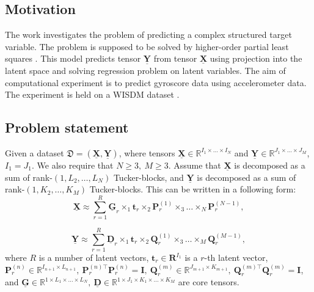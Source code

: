 \documentclass[../../main.tex]{subfiles}
\begin{document}
\subsection{Motivation}

%
%


The work investigates the problem of predicting a complex structured target variable. The problem is supposed to be solved by higher-order partial least squares \cite{zhao2012higher}. This model predicts tensor $\underline{\mathbf{Y}}$ from tensor $\underline{\mathbf{X}}$ using projection into the latent space and solving regression problem on latent variables. The aim of computational experiment is to predict gyroscore data using accelerometer data. The experiment is held on a WISDM dataset \cite{kwapisz2011activity}. 

\subsection{Problem statement}

Given a dataset $\mathfrak{D} = (\underline{\mathbf{X}}, \underline{\mathbf{Y}})$, where tensors $\underline{\mathbf{X}} \in \mathbb{R}^{I_1\times \ldots\times I_N}$ and $\underline{\mathbf{Y}} \in \mathbb{R}^{J_1\times \ldots \times J_M}$, $I_1 = J_1$. We also require that $N \geq 3, ~M\geq 3$. Assume that $\underline{\mathbf{X}}$ is decomposed as a sum of rank-$(1, L_2, \ldots, L_N)$ Tucker-blocks, and $\underline{\mathbf{Y}}$ is decomposed as a sum of rank-$(1, K_2, \ldots, K_M)$ Tucker-blocks. This can be written in a following form:
\begin{equation}
\underline{\mathbf{X}} \approx \sum_{r=1}^R\underline{\mathbf{G}}_r\times_1\mathbf{t}_r\times_2\mathbf{P}^{(1)}_r\times_3\ldots \times_N\mathbf{P}_r^{(N - 1)},
\end{equation}

\begin{equation}
\underline{\mathbf{Y}} \approx \sum_{r=1}^R\underline{\mathbf{D}}_r\times_1\mathbf{t}_r\times_2\mathbf{Q}^{(1)}_r\times_3\ldots \times_M\mathbf{Q}_r^{(M - 1)},
\end{equation}
where $R$ is a number of latent vectors, $\mathbf{t}_r \in \mathbf{R}^{I_1}$ is a $r$-th latent vector, 
$\mathbf{P}_r^{(n)} \in \mathbb{R}^{I_{n+1}\times L_{n+1}}, ~\mathbf{P}_r^{(n)\top}\mathbf{P}_r^{(n)} = \mathbf{I}, ~\mathbf{Q}_r^{(m)} \in \mathbb{R}^{J_{m+1}\times K_{m + 1}}, ~\mathbf{Q}_r^{(m)\top}\mathbf{Q}_r^{(m)} = \mathbf{I}$, and $\underline{\mathbf{G}} \in \mathbb{R}^{1\times L_1\times \ldots \times L_N}, ~\underline{\mathbf{D}}\in \mathbb{R}^{1\times J_1\times K_1\times \ldots \times K_M}$ are core tensors.
\end{document}
